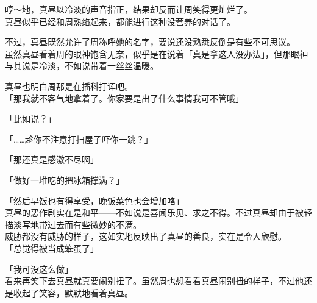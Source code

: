 哼～地，真昼以冷淡的声音指正，结果却反而让周笑得更灿烂了。\\

真昼似乎已经和周熟络起来，都能进行这种没营养的对话了。

不过，真昼既然允许了周称呼她的名字，要说还没熟悉反倒是有些不可思议。\\

虽然真昼看着周的眼神饱含无奈，似乎是在说着「真是拿这人没办法」，但那眼神与其说是冷淡，不如说带着一丝丝温暖。

真昼也明白周那是在插科打诨吧。\\

「那我就不客气地拿着了。你家要是出了什么事情我可不管哦」

「比如说？」

「……趁你不注意打扫屋子吓你一跳？」

「那还真是感激不尽啊」

「做好一堆吃的把冰箱撑满？」

「然后早饭也有得享受，晚饭菜色也会增加咯」\\

真昼的恶作剧实在是和平——不如说是喜闻乐见、求之不得。不过真昼却由于被轻描淡写地带过去而有些微妙的不满。\\

威胁都没有威胁的样子，这如实地反映出了真昼的善良，实在是令人欣慰。\\

「总觉得被当成笨蛋了」

「我可没这么做」\\

看来再笑下去真昼就真要闹别扭了。虽然周也想看看真昼闹别扭的样子，不过他还是收起了笑容，默默地看着真昼。
